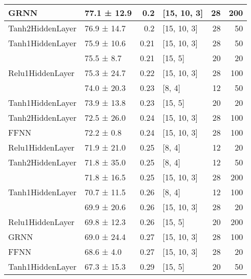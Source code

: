 \begin{table*}[h]
\begin{tabular}{llrlrr}
 \hline
GRNN                                & 77.1 ± 12.9 &  0.2  & [15, 10, 3]    &         28 &      200 \\
 \hline
Tanh2HiddenLayer                    & 76.9 ± 14.7 &  0.2  & [15, 10, 3]    &         28 &       50 \\
 \hline
Tanh1HiddenLayer                    & 75.9 ± 10.6 &  0.21 & [15, 10, 3]    &         28 &       50 \\
 \hline
\multirow{3}{*}{Relu1HiddenLayer}   & 75.5 ± 8.7  &  0.21 & [15, 5]        &         20 &       20 \\
                                            & 75.3 ± 24.7 &  0.22 & [15, 10, 3]    &         28 &      100 \\
                                            & 74.0 ± 20.3 &  0.23 & [8, 4]         &         12 &       50 \\
 \hline
Tanh1HiddenLayer                    & 73.9 ± 13.8 &  0.23 & [15, 5]        &         20 &       20 \\
 \hline
Tanh2HiddenLayer                    & 72.5 ± 26.0 &  0.24 & [15, 10, 3]    &         28 &      100 \\
 \hline
FFNN                                & 72.2 ± 0.8  &  0.24 & [15, 10, 3]    &         28 &      100 \\
 \hline
Relu1HiddenLayer                    & 71.9 ± 21.0 &  0.25 & [8, 4]         &         12 &       20 \\
 \hline
Tanh2HiddenLayer                    & 71.8 ± 35.0 &  0.25 & [8, 4]         &         12 &       50 \\
 \hline
\multirow{3}{*}{Tanh1HiddenLayer}   & 71.8 ± 16.5 &  0.25 & [15, 10, 3]    &         28 &      200 \\
                                            & 70.7 ± 11.5 &  0.26 & [8, 4]         &         12 &      100 \\
                                            & 69.9 ± 20.6 &  0.26 & [15, 10, 3]    &         28 &       20 \\
 \hline
Relu1HiddenLayer                    & 69.8 ± 12.3 &  0.26 & [15, 5]        &         20 &      200 \\
 \hline
GRNN                                & 69.0 ± 24.4 &  0.27 & [15, 10, 3]    &         28 &      100 \\
 \hline
FFNN                                & 68.6 ± 4.0  &  0.27 & [15, 10, 3]    &         28 &       20 \\
 \hline
\multirow{2}{*}{Tanh1HiddenLayer}   & 67.3 ± 15.3 &  0.29 & [15, 5]        &         20 &       50 \\

\end{tabular}
\end{table*}
